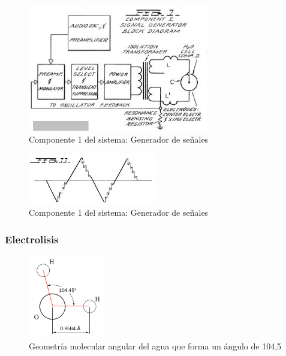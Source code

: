 \documentclass[12pt,twoside,onecolumn]{article}
\begin{document}
\begin{figure}
  \centering
   \includegraphics[width=0.7\textwidth]{figures/comp1}
  \caption{Componente 1 del sistema: Generador de señales}
  \label{fig:comp1}
\end{figure}

\begin{figure}
  \centering
   \includegraphics[width=0.5\textwidth]{figures/sawtooth}
  \caption{Componente 1 del sistema: Generador de señales}
  \label{fig:sawtooth}
\end{figure}

\subsubsection{Electrolisis}



\begin{figure}
  \centering
   \includegraphics[width=0.3\textwidth]{figures/h2o}
  \caption{Geometría molecular angular del agua que forma un ángulo de 104,5}
  \label{fig:h2o}
\end{figure}
\end{document}
